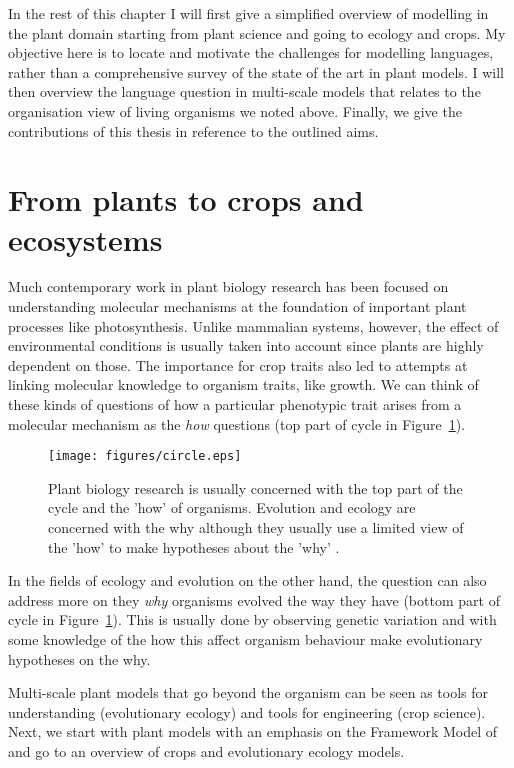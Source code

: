 In the rest of this chapter I will first give a simplified overview of modelling
in the plant domain starting from plant science and going to ecology and
crops. My objective here is to locate and motivate the challenges for modelling
languages, rather than a comprehensive survey of the state of the art in plant
models. I will then overview the language question in multi-scale models that
relates to the organisation view of living organisms we noted above. Finally, we
give the contributions of this thesis in reference to the outlined aims.

\section{From plants to crops and ecosystems}
Much contemporary work in plant biology research has been focused on
understanding molecular mechanisms at the foundation of important plant
processes like photosynthesis. Unlike mammalian systems, however, the effect of
environmental conditions is usually taken into account since plants are highly
dependent on those. The importance for crop traits also led to attempts at
linking molecular knowledge to organism traits, like growth. We can think of
these kinds of questions of how a particular phenotypic trait arises from a
molecular mechanism as the \emph{how} questions (top part of cycle in
Figure~\ref{fig:circle}).

\begin{figure}[tb]
  \centering
  \texttt{[image: figures/circle.eps]}
  \caption{Plant biology research is usually concerned with the top part of the
    cycle and the 'how' of organisms. Evolution and ecology are concerned with
    the why although they usually use a limited view of the 'how' to make
    hypotheses about the 'why' \citep[adapted
    from][]{millar_intracellular_2016}.}
  \label{fig:circle}
\end{figure}

In the fields of ecology and evolution on the other hand, the question can also
address more on they \emph{why} organisms evolved the way they have (bottom part
of cycle in Figure~\ref{fig:circle}). This is usually done by observing genetic
variation and with some knowledge of the how this affect organism behaviour make
evolutionary hypotheses on the why.

Multi-scale plant models that go beyond the organism can be seen as tools for
understanding (evolutionary ecology) and tools for engineering (crop
science). Next, we start with plant models with an emphasis on the Framework
Model of \citet{chew_multiscale_2014} and go to an overview of crops and
evolutionary ecology models.

